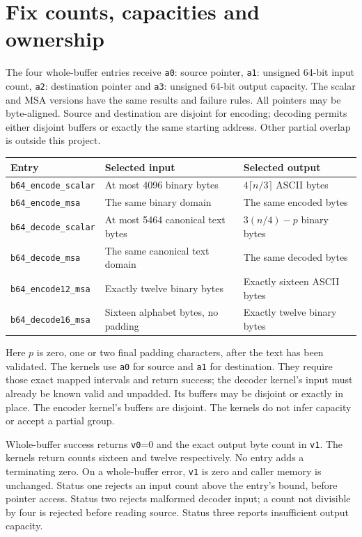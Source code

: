 \section{Fix counts, capacities and ownership}
The four whole-buffer entries receive \texttt{a0}: source pointer, \texttt{a1}: unsigned
64-bit input count, \texttt{a2}: destination pointer and \texttt{a3}: unsigned 64-bit
output capacity. The scalar and MSA versions have the same results and failure rules.
All pointers may be byte-aligned. Source and destination are disjoint for encoding;
decoding permits either disjoint buffers or exactly the same starting address. Other
partial overlap is outside this project.

\begin{longtable}{p{}p{}p{}}
  Entry                        & Selected input                     & Selected output                   \\
  \hline
  \texttt{b64\_encode\_scalar} & At most 4096 binary bytes          & \(4\lceil n/3\rceil\) ASCII bytes \\
  \texttt{b64\_encode\_msa}    & The same binary domain             & The same encoded bytes            \\
  \texttt{b64\_decode\_scalar} & At most 5464 canonical text bytes  & \(3(n/4)-p\) binary bytes         \\
  \texttt{b64\_decode\_msa}    & The same canonical text domain     & The same decoded bytes            \\
  \texttt{b64\_encode12\_msa}  & Exactly twelve binary bytes        & Exactly sixteen ASCII bytes       \\
  \texttt{b64\_decode16\_msa}  & Sixteen alphabet bytes, no padding & Exactly twelve binary bytes       \\
\end{longtable}

Here \(p\) is zero, one or two final padding characters, after the text has been
validated. The kernels use \texttt{a0} for source and \texttt{a1} for destination.
They require those exact mapped intervals and return success; the decoder kernel's
input must already be known valid and unpadded. Its buffers may be disjoint or exactly
in place. The encoder kernel's buffers are disjoint. The kernels do not infer capacity
or accept a partial group.

Whole-buffer success returns \texttt{v0}=0 and the exact output byte count in
\texttt{v1}. The kernels return counts sixteen and twelve respectively. No entry adds
a terminating zero. On a whole-buffer error, \texttt{v1} is zero and caller memory is
unchanged. Status one rejects an input count above the entry's bound, before pointer
access. Status two rejects malformed decoder input; a count not divisible by four is
rejected before reading source. Status three reports insufficient output capacity.


